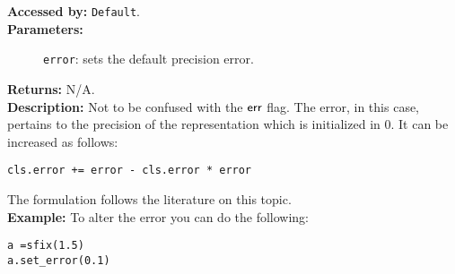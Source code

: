 
\textbf{Accessed by:} \verb|Default|.		 \\
\textbf{Parameters:}
\begin{description}
  \item[]\verb|error|:  sets the default precision error.
\end{description}
\textbf{Returns:} N/A. \\
\textbf{Description:} Not to be confused with the
$\mathsf{err}$ flag. The error, in this case, pertains to the precision of the representation which is initialized in 0. It can be increased as follows:
\begin{lstlisting}
cls.error += error - cls.error * error
\end{lstlisting}
The formulation follows the literature on this topic. \\
\textbf{Example:}
To alter the error you can do the following:
\begin{lstlisting}
a =sfix(1.5)
a.set_error(0.1)
\end{lstlisting}

